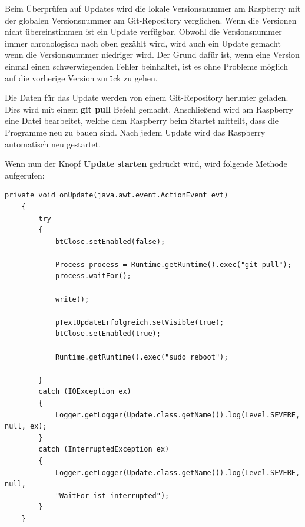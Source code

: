 \vspace{10pt}

Beim Überprüfen auf Updates wird die lokale Versionsnummer am Raspberry mit der globalen Versionsnummer am Git-Repository verglichen. Wenn die Versionen nicht übereinstimmen ist ein Update verfügbar. Obwohl die Versionsnummer immer chronologisch nach oben gezählt wird, wird auch ein Update gemacht wenn die Versionsnummer niedriger wird. Der Grund dafür ist, wenn eine Version einmal einen schwerwiegenden Fehler beinhaltet, ist es ohne Probleme möglich auf die vorherige Version zurück zu gehen. 

\vspace{10pt}

Die Daten für das Update werden von einem Git-Repository herunter geladen. Dies wird mit einem \textbf{git pull} Befehl gemacht. Anschließend wird am Raspberry eine Datei bearbeitet, welche dem Raspberry beim Startet mitteilt, dass die Programme neu zu bauen sind. Nach jedem Update wird das Raspberry automatisch neu gestartet.

\vspace{10pt}

Wenn nun der Knopf \textbf{Update starten} gedrückt wird, wird folgende Methode aufgerufen:
\begin{lstlisting}[style=JavaStyle, caption= Update]
    private void onUpdate(java.awt.event.ActionEvent evt)                          
    {                              
        try
        {
            btClose.setEnabled(false);
            
            Process process = Runtime.getRuntime().exec("git pull");
            process.waitFor();

            write();

            pTextUpdateErfolgreich.setVisible(true);
            btClose.setEnabled(true);

            Runtime.getRuntime().exec("sudo reboot");

        }
        catch (IOException ex)
        {
            Logger.getLogger(Update.class.getName()).log(Level.SEVERE, null, ex);
        }
        catch (InterruptedException ex)
        {
            Logger.getLogger(Update.class.getName()).log(Level.SEVERE, null, 
            "WaitFor ist interrupted");
        }        
    }
\end{lstlisting}

